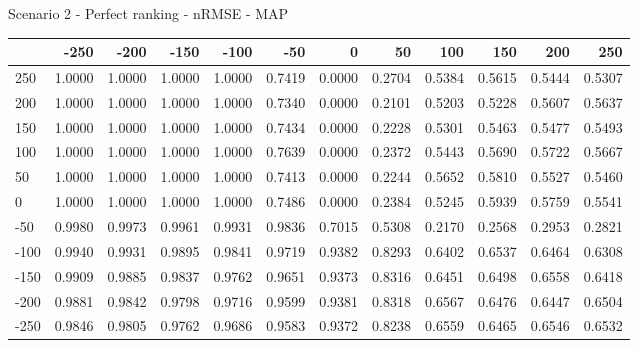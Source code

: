 Scenario 2 - Perfect ranking - nRMSE - MAP
\begin{tabular}{lrrrrrrrrrrr}
\toprule
{} &   -250 &   -200 &   -150 &   -100 &   -50  &    0   &    50  &    100 &    150 &    200 &    250 \\
\midrule
 250 & 1.0000 & 1.0000 & 1.0000 & 1.0000 & 0.7419 & 0.0000 & 0.2704 & 0.5384 & 0.5615 & 0.5444 & 0.5307 \\
 200 & 1.0000 & 1.0000 & 1.0000 & 1.0000 & 0.7340 & 0.0000 & 0.2101 & 0.5203 & 0.5228 & 0.5607 & 0.5637 \\
 150 & 1.0000 & 1.0000 & 1.0000 & 1.0000 & 0.7434 & 0.0000 & 0.2228 & 0.5301 & 0.5463 & 0.5477 & 0.5493 \\
 100 & 1.0000 & 1.0000 & 1.0000 & 1.0000 & 0.7639 & 0.0000 & 0.2372 & 0.5443 & 0.5690 & 0.5722 & 0.5667 \\
 50  & 1.0000 & 1.0000 & 1.0000 & 1.0000 & 0.7413 & 0.0000 & 0.2244 & 0.5652 & 0.5810 & 0.5527 & 0.5460 \\
 0   & 1.0000 & 1.0000 & 1.0000 & 1.0000 & 0.7486 & 0.0000 & 0.2384 & 0.5245 & 0.5939 & 0.5759 & 0.5541 \\
-50  & 0.9980 & 0.9973 & 0.9961 & 0.9931 & 0.9836 & 0.7015 & 0.5308 & 0.2170 & 0.2568 & 0.2953 & 0.2821 \\
-100 & 0.9940 & 0.9931 & 0.9895 & 0.9841 & 0.9719 & 0.9382 & 0.8293 & 0.6402 & 0.6537 & 0.6464 & 0.6308 \\
-150 & 0.9909 & 0.9885 & 0.9837 & 0.9762 & 0.9651 & 0.9373 & 0.8316 & 0.6451 & 0.6498 & 0.6558 & 0.6418 \\
-200 & 0.9881 & 0.9842 & 0.9798 & 0.9716 & 0.9599 & 0.9381 & 0.8318 & 0.6567 & 0.6476 & 0.6447 & 0.6504 \\
-250 & 0.9846 & 0.9805 & 0.9762 & 0.9686 & 0.9583 & 0.9372 & 0.8238 & 0.6559 & 0.6465 & 0.6546 & 0.6532 \\
\bottomrule
\end{tabular}

